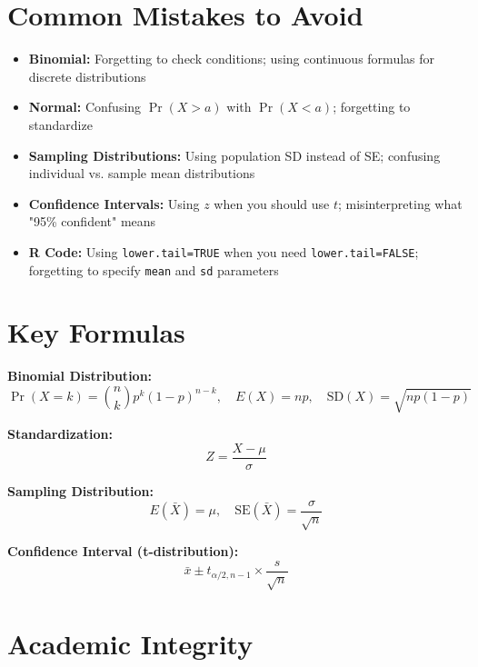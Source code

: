 \documentclass[11pt]{article}
\begin{document}
\section*{Common Mistakes to Avoid}

\begin{itemize}
\item \textbf{Binomial:} Forgetting to check conditions; using continuous formulas for discrete distributions
\item \textbf{Normal:} Confusing $\Pr(X > a)$ with $\Pr(X < a)$; forgetting to standardize
\item \textbf{Sampling Distributions:} Using population SD instead of SE; confusing individual vs. sample mean distributions
\item \textbf{Confidence Intervals:} Using $z$ when you should use $t$; misinterpreting what "95\% confident" means
\item \textbf{R Code:} Using \texttt{lower.tail=TRUE} when you need \texttt{lower.tail=FALSE}; forgetting to specify \texttt{mean} and \texttt{sd} parameters
\end{itemize}

\section*{Key Formulas}

\textbf{Binomial Distribution:}
$$\Pr(X = k) = \binom{n}{k} p^k (1-p)^{n-k}, \quad E(X) = np, \quad \text{SD}(X) = \sqrt{np(1-p)}$$

\textbf{Standardization:}
$$Z = \frac{X - \mu}{\sigma}$$

\textbf{Sampling Distribution:}
$$E(\bar{X}) = \mu, \quad \text{SE}(\bar{X}) = \frac{\sigma}{\sqrt{n}}$$

\textbf{Confidence Interval (t-distribution):}
$$\bar{x} \pm t_{\alpha/2, n-1} \times \frac{s}{\sqrt{n}}$$

\section*{Academic Integrity}
\end{document}
